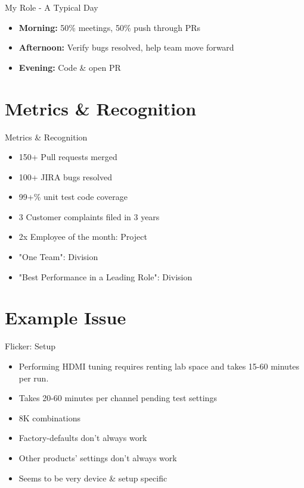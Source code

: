 \documentclass[12pt]{beamer}
\begin{document}
\begin{frame}{My Role - A Typical Day}
    \begin{itemize}
        \item \textbf{Morning:} 50\% meetings, 50\% push through PRs
        \item \textbf{Afternoon:} Verify bugs resolved, help team move forward
        \item \textbf{Evening:} Code \& open PR
    \end{itemize}
\end{frame}


\section{Metrics \& Recognition}
   \begin{frame}{Metrics \& Recognition}
       \begin{itemize}
           \item 150+ Pull requests merged
           \item 100+ JIRA bugs resolved
           \item 99+\% unit test code coverage
           \item 3 Customer complaints filed in 3 years
           \item 2x Employee of the month: Project
           \item "One Team": Division
           \item "Best Performance in a Leading Role": Division
       \end{itemize}
    \end{frame}

\section{Example Issue}

\begin{frame}{Flicker: Setup}
    \begin{itemize}
        \item Performing HDMI tuning requires renting lab space and takes 15-60 minutes per run.
        \item Takes 20-60 minutes per channel pending test settings
        \item 8K combinations
        \item Factory-defaults don't always work
        \item Other products' settings don't always work
        \item Seems to be very device \& setup specific
    \end{itemize}
\end{frame}
\end{document}
